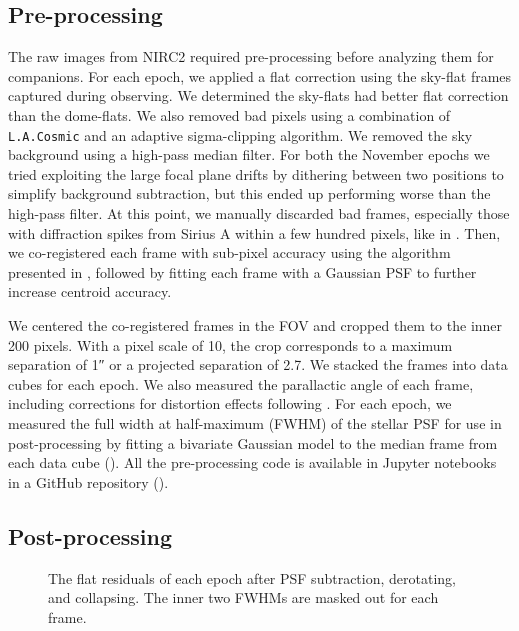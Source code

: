 \documentclass[twocolumn]{aastex631}
\begin{document}
\subsection{Pre-processing}\label{sec:pre-processing}

The raw images from NIRC2 required pre-processing before analyzing them for companions. For each epoch, we applied a flat correction using the sky-flat frames captured during observing. We determined the sky-flats had better flat correction than the dome-flats. We also removed bad pixels using a combination of \texttt{L.A.Cosmic} \citep{vandokkumCosmicRayRejectionLaplacian2001a} and an adaptive sigma-clipping algorithm. We removed the sky background using a high-pass median filter. For both the November epochs we tried exploiting the large focal plane drifts by dithering between two positions to simplify background subtraction, but this ended up performing worse than the high-pass filter. At this point, we manually discarded bad frames, especially those with diffraction spikes from Sirius A within a few hundred pixels, like in . Then, we co-registered each frame with sub-pixel accuracy using the algorithm presented in \citet{guizar-sicairosEfficientSubpixelImage2008}, followed by fitting each frame with a Gaussian PSF to further increase centroid accuracy.

We centered the co-registered frames in the FOV and cropped them to the inner 200 pixels. With a pixel scale of \qty{10}{\milliarcsecond}, the crop corresponds to a maximum separation of \ang{;;1} or a projected separation of \qty{2.7}{\au}. We stacked the frames into data cubes for each epoch. We also measured the parallactic angle of each frame, including corrections for distortion effects following \citet{yeldaImprovingGalacticCenter2010}. For each epoch, we measured the full width at half-maximum (FWHM) of the stellar PSF for use in post-processing by fitting a bivariate Gaussian model to the median frame from each data cube (). All the pre-processing code is available in Jupyter notebooks in a GitHub repository ().

\subsection{Post-processing}

\begin{figure*}
    \centering
    \caption{The flat residuals of each epoch after PSF subtraction, derotating, and collapsing. The inner two FWHMs are masked out for each frame.}
    \label{fig:residuals}
\end{figure*}
\end{document}
